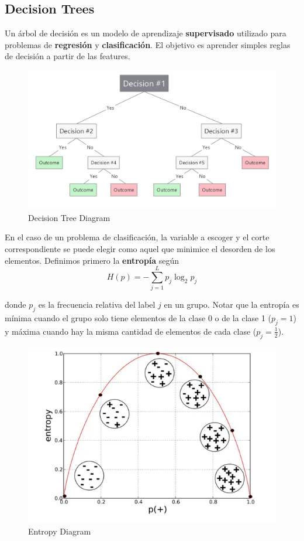 \subsection{Decision Trees}

Un árbol de decisión es un modelo de aprendizaje \textbf{supervisado} utilizado para problemas de \textbf{regresión} y \textbf{clasificación}. El objetivo es aprender simples reglas de decisión a partir de las features. 

\begin{figure}[H]
    \center
    \includegraphics[scale=0.25]{notebooks/ML/img/decision_tree_diagram.png}
    \caption{Decision Tree Diagram}
\end{figure}

En el caso de un problema de clasificación, la variable a escoger y el corte correspondiente se puede elegir como aquel que minimice el desorden de los elementos. Definimos primero la \textbf{entropía} según 
$$H(p) = - \sum_{j=1}^{L}p_j\log_{2}p_j$$

donde $p_j$ es la frecuencia relativa del label $j$ en un grupo. Notar que la entropía es mínima cuando el grupo solo tiene elementos de la clase 0 o de la clase 1 ($p_j = 1$) y máxima cuando hay la misma cantidad de elementos de cada clase ($p_j = \frac{1}{2}$). 

\begin{figure}[H]
    \center
    \includegraphics[scale=0.3]{notebooks/ML/img/entropy_diagram.png}
    \caption{Entropy Diagram}
\end{figure}

